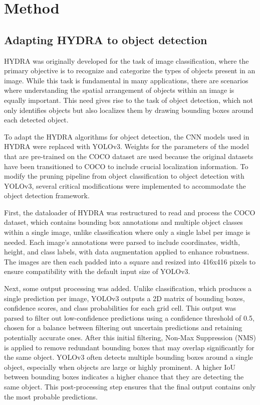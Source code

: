 \documentclass[journal,onecolumn,12pt]{IEEEtran}
\begin{document}
\section{Method}

\subsection{Adapting HYDRA to object detection}
HYDRA was originally developed for the task of image classification, where the primary objective is to recognize and categorize the types of objects present in an image. While this task is fundamental in many applications, there are scenarios where understanding the spatial arrangement of objects within an image is equally important. This need gives rise to the task of object detection, which not only identifies objects but also localizes them by drawing bounding boxes around each detected object.

To adapt the HYDRA algorithms for object detection, the CNN models used in HYDRA were replaced with YOLOv3. Weights for the parameters of the model that are pre-trained on the COCO dataset are used because the original datasets have been transitioned to COCO to include crucial localization information. To modify the pruning pipeline from object classification to object detection with YOLOv3, several critical modifications were implemented to accommodate the object detection framework. 

First, the dataloader of HYDRA was restructured to read and process the COCO dataset, which contains bounding box annotations and multiple object classes within a single image, unlike classification where only a single label per image is needed. Each image’s annotations were parsed to include coordinates, width, height, and class labels, with data augmentation applied to enhance robustness. The images are then each padded into a square and resized into 416x416 pixels to ensure compatibility with the default input size of YOLOv3.

Next, some output processing was added. Unlike classification, which produces a single prediction per image, YOLOv3 outputs a 2D matrix of bounding boxes, confidence scores, and class probabilities for each grid cell. This output was parsed to filter out low-confidence predictions using a confidence threshold of 0.5, chosen for a balance between filtering out uncertain predictions and retaining potentially accurate ones. After this initial filtering, Non-Max Suppression (NMS) is applied to remove redundant bounding boxes that may overlap significantly for the same object. YOLOv3 often detects multiple bounding boxes around a single object, especially when objects are large or highly prominent. A higher IoU between bounding boxes indicates a higher chance that they are detecting the same object. This post-processing step ensures that the final output contains only the most probable predictions.
\end{document}
